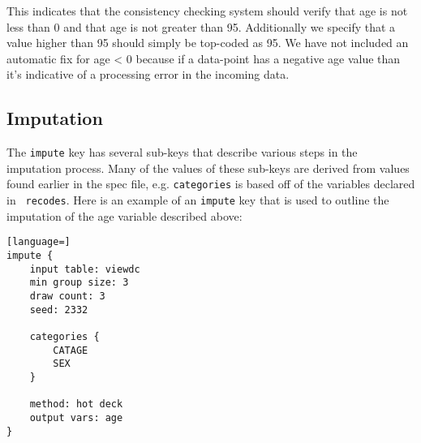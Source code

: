 \documentclass{article}
\begin{document}
This indicates that the consistency checking system should verify that age is not less
than 0 and that age is not greater than 95. Additionally we specify that a value higher
than 95 should simply be top-coded as 95. We have not included an automatic fix for
age < 0 because if a data-point has a negative age value than it's indicative of a
processing error in the incoming data.



\subsection{Imputation} \label{imputesec}
The {\tt impute} key has several sub-keys that describe various steps in the imputation
process. Many of the values of these sub-keys are derived from values found earlier
in the spec file, e.g. {\tt categories} is based off of the variables declared in {\tt
recodes}. Here is an example of an {\tt impute} key that is used to
outline the imputation of the age variable described above:

\begin{lstlisting}[language=]
impute {
    input table: viewdc
    min group size: 3
    draw count: 3
    seed: 2332

    categories {
        CATAGE
        SEX
    }

    method: hot deck
    output vars: age
}
\end{lstlisting}
\end{document}
